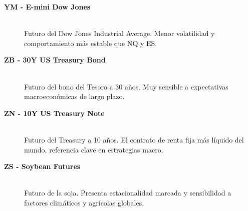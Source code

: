 \begin{description}
    \item[\textbf{YM - E-mini Dow Jones}] \hfill \\
    Futuro del Dow Jones Industrial Average. Menor volatilidad y comportamiento más estable que NQ y ES.

    \item[\textbf{ZB - 30Y US Treasury Bond}] \hfill \\
    Futuro del bono del Tesoro a 30 años. Muy sensible a expectativas macroeconómicas de largo plazo.

    \item[\textbf{ZN - 10Y US Treasury Note}] \hfill \\
    Futuro del Treasury a 10 años. El contrato de renta fija más líquido del mundo, referencia clave en estrategias macro.

    \item[\textbf{ZS - Soybean Futures}] \hfill \\
    Futuro de la soja. Presenta estacionalidad marcada y sensibilidad a factores climáticos y agrícolas globales.

\end{description}

